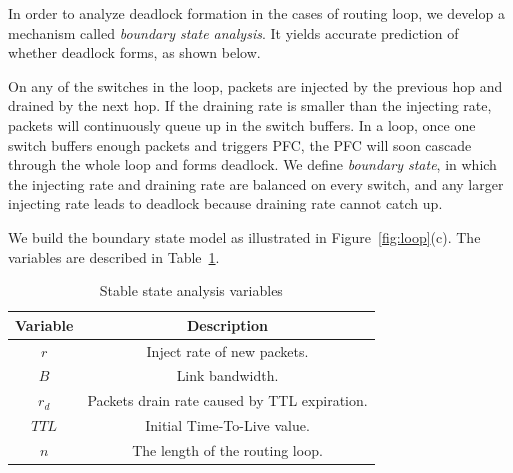 In order to analyze deadlock formation in the cases of routing loop, we develop a mechanism called
{\em boundary state analysis}. It yields accurate prediction of whether deadlock forms,
as shown below.

On any of the switches in the loop, packets are injected by the previous hop and drained by the next hop.
If the draining rate is smaller than the injecting rate, packets will continuously queue up in the
switch buffers. In a loop, once one switch buffers enough packets and triggers PFC, the PFC will soon
cascade through the whole loop and forms deadlock.
We define {\em boundary state}, in which the injecting rate and draining rate are balanced on every
switch, and any larger injecting rate leads to deadlock because draining rate cannot catch up.

We build the boundary state model as illustrated in
Figure~\ref{fig:loop}(c). The variables are described in Table~\ref{tab:stable_state}.


\begin{table}[h]
\centering
\vspace{-0.1in}
\caption{\small Stable state analysis variables}
\vspace{-0.15in}
\label{tab:stable_state}
{\small
\begin{tabular}{|c|c|}
 \hline
Variable &  Description \\
\hline
$r$ & Inject rate of new packets. \\
\hline
$B$ & Link bandwidth. \\
\hline
$r_d$ & Packets drain rate caused by TTL expiration. \\
\hline
$TTL$ & Initial Time-To-Live value. \\
\hline
$n$ & The length of the routing loop. \\
\hline
\end{tabular}
}
\vspace{-0.15in}
\end{table}

